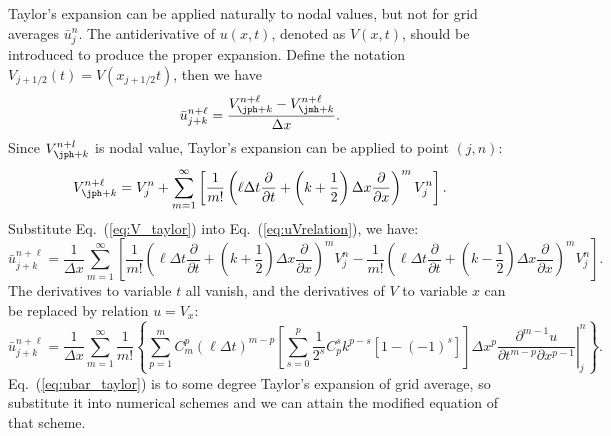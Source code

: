 \documentclass[]{article}
\begin{document}
Taylor's expansion can be applied naturally to nodal values, but not for
grid averages $\bar u_j^n$. The antiderivative of $u(x,t)$, 
denoted as $V(x,t)$,
should be introduced to produce the proper expansion. Define the notation
$V_{j+1/2}(t)=V(x_{j+1/2}t)$, then we have
\begin{equation}
    \bar u_{j+k}^{n+\ell}=
    \frac{V_{\jph+k}^{n+\ell}-V_{\jmh+k}^{n+\ell}}{\Delta x}.
    \label{eq:uVrelation}
\end{equation}
Since $V_{\jph+k}^{n+l}$ is nodal value, Taylor's expansion can be
applied to point $(j,n)$:
\begin{equation}
    V_{\jph+k}^{n+\ell} = V_{j}^n + \sum_{m=1}^{\infty}
    \left[ 
	\frac{1}{m!} 
	\left(
	\ell\Delta t \frac{\partial}{\partial t} + 
	\left(k+\frac{1}{2}\right) \Delta x\frac{\partial}{\partial x}
	\right)^m V_j^n
    \right].
    \label{eq:V_taylor}
\end{equation}
Substitute Eq.~(\ref{eq:V_taylor}) into Eq.~(\ref{eq:uVrelation}), we
have:
\begin{equation}
    \bar u_{j+k}^{n+\ell} = \frac{1}{\Delta x} \sum_{m=1}^{\infty} 
    \left[
	\frac{1}{m!}\left( \ell\Delta t\frac{\partial}{\partial t} +
	\left(k+\frac{1}{2}\right)\Delta x\frac{\partial}{\partial x}\right)^m 
	V_j^n -
	\frac{1}{m!}\left(\ell\Delta t\frac{\partial}{\partial t} +
	\left(k-\frac{1}{2}\right)\Delta x\frac{\partial}{\partial x}\right)^m 
	V_j^n
    \right].
    \label{eq:uVrelation2}
\end{equation}
The derivatives to variable $t$ all vanish, and the derivatives of $V$ to
variable $x$ can be replaced by relation $u=V_x$:
\begin{equation}
    \bar u_{j+k}^{n+\ell} = \frac{1}{\Delta x} \sum_{m=1}^{\infty}\frac{1}{m!}
    \left\{
	\sum_{p=1}^m C_m^p(\ell\Delta t)^{m-p} 
	\left[
	    \sum_{s=0}^p \frac{1}{2^s}C_p^s k^{p-s}\left[1-(-1)^s\right]
	\right]
	\Delta x^p 
	\left. 
	\frac{\partial ^{m-1}u}{\partial t^{m-p}\partial x^{p-1}}
	\right|_j^n
    \right\}.
    \label{eq:ubar_taylor}
\end{equation}
Eq.~(\ref{eq:ubar_taylor}) is to some degree Taylor's expansion of
grid average, so substitute it into numerical schemes and we can
attain the modified equation of that scheme.
\end{document}
